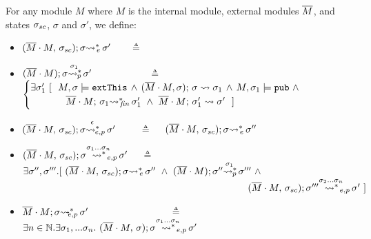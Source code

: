 \begin{definition}
For any module $M$  where $M$ is the internal module, external modules $\Mtwo$, and states $\sigma\bd$,  $\sigma$ and $\sigma'$, we define:

\begin{itemize}
\item
 ${\leadstoBoundedThreeStarExt {\Mtwo\cdot M} {\sigma\bd}  {\sigma}  {\sigma'}}$ \ \ \ $\triangleq$ \ \ 
\item
${\WithPub {\Mtwo\cdot M}    {\sigma}  {\sigma'} {\sigma_1}}$ \  \ \  \ \ \ \ \ \ \ \ $\triangleq$ \ \ 
$\begin{cases}
\exists   \sigma_1'\ [ \ \   M, \sigma  \models \extThis \, \wedge \,  \leadstoBoundedThree  {\Mtwo\cdot M} {\sigma} {\sigma}  {\sigma_{1}}\, \wedge\,  M, \sigma_1 \models \pubMeth \ \wedge \\ 
\strut \ \ \ \ \  \ \ \ \ \ \   \leadstoBoundedStarFin {\Mtwo\cdot M} {\sigma_1}  {\sigma_1'}  \ \wedge \   \leadstoBounded  {\Mtwo\cdot M} {\sigma_1'}      {\sigma'} \ \ ] 
\end{cases}
$
\item
$\WithExtPub {\Mtwo\cdot M} {\sigma\bd}  {\sigma}  {\sigma'} {\epsilon}$ \ \     \ \  $\triangleq$ \ \ 
$\leadstoBoundedThreeStarExt {\Mtwo\cdot M} {\sigma\bd}  {\sigma}  {\sigma''}$
\item
$\WithExtPub {\Mtwo\cdot M} {\sigma\bd}  {\sigma}  {\sigma'} {\sigma_1...\sigma_n}$   \ \  $\triangleq$ \ \ 
$\exists \sigma'',\sigma'''.[\   {\leadstoBoundedThreeStarExt {\Mtwo\cdot M} {\sigma\bd}  {\sigma}  {\sigma''}}\ \wedge\ 
{\WithPub {\Mtwo\cdot M}    {\sigma''}  {\sigma'''} {\sigma_1}} \ \wedge$\\   
$\strut \hspace{8.2cm} {\WithExtPub {\Mtwo\cdot M} {\sigma\bd}  {\sigma'''}  {\sigma'} {\sigma_2...\sigma_n} }  \ ]$
\item
$\leadstoBoundedExtPub {\Mtwo\cdot M}    {\sigma}  {\sigma'} $   \ \ \ \ \   \ \ \  \ \ \ \   \ \ \ \  $\triangleq$   \ \ 
  $ \exists n\in \mathbb{N}. \exists \sigma_1,...\sigma_n. \ \WithExtPub {\Mtwo\cdot M} {\sigma}  {\sigma}  {\sigma'} {\sigma_1...\sigma_n} 
$
\end{itemize}
\end{definition}

